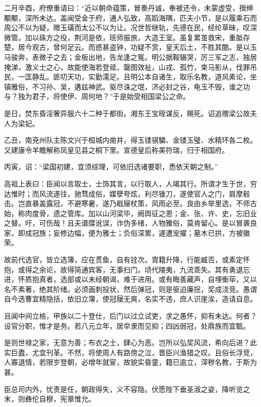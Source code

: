 \documentclass[12pt,UTF8]{ctexbook}
\begin{document}
二月辛酉，府僚重请曰：“近以朝命蕴策，冒奏丹诚，奉被还令，未蒙虚受，搢绅颙颙，深所未达。盖闻受金于府，通人弘致，高蹈海隅，匹夫小节，是以履乘石而周公不以为疑，赠玉璜而太公不以为让。况世哲继轨，先德在民，经纶草昧，叹深微管。加以硃方之役，荆河是依，班师振旅，大造王室。虽复累茧救宋，重胝存楚，居今观古，曾何足云。而惑甚盗钟，功疑不赏，皇天后土，不胜其酷。是以玉马骏奔，表微子之去；金板出地，告龙逢之冤。明公据鞍辍哭，厉三军之志，独居掩涕，激义士之心，故能使海若登祗，罄图效祉，山戎、孤竹，束马影从，伐罪吊民，一匡静乱。匪叨天功，实勤濡足。且明公本自诸生，取乐名教，道风素论，坐镇雅俗，不习孙、吴，遘兹神武。驱尽诛之氓，济必封之谷，龟玉不毁，谁之功与？独为君子，将使伊、周何地？”于是始受相国梁公之命。

是日，焚东昏淫奢异服六十二种于都街。湘东王宝晊谋反，赐死。诏追赠梁公故夫人为梁妃。

乙丑，南兗州队主陈文兴于桓城内凿井，得玉镂骐驎、金镂玉璧、水精环各二枚。又建康令羊瞻解称凤皇见县之桐下里。宣德皇后称美符瑞，归于相国府。

丙寅，诏：“梁国初建，宜须综理，可依旧选诸要职，悉依天朝之制。”

高祖上表曰：臣闻以言取士，士饰其言，以行取人，人竭其行。所谓才生于世，穷达惟时；而风流遂往，驰骛成俗，媒孽夸炫，利尽锥刀，遂使官人之门，肩摩毂击。岂直暴盖露冠，不避寒暑，遂乃戢屦杖策，风雨必至。良由乡举里选，不师古始，称肉度骨，遗之管库。加以山河梁毕，阙舆征之恩；金、张、许、史，忘旧业之替。吁，可伤哉！且夫谱牒讹误，诈伪多绪，人物雅俗，莫肯留心。是以冒袭良家，即成冠族；妄修边幅，便为雅士；负俗深累，遽遭宠擢；墓木已拱，方被徽荣。

故前代选官，皆立选簿，应在贯鱼，自有铨次。胄籍升降，行能臧否，或素定怀抱，或得之余论，故得简通宾客，无事扫门。顷代陵夷，九流乖失。其有勇退忘进，怀质抱真者，选部或以未经朝谒，难于进用。或有晦善藏声，自埋衡荜，又以名不素著，绝其阶绪。必须画刺投状，然后弹冠，则是驱迫廉捴，奖成浇竞。愚谓自今选曹宜精隐括，依旧立簿，使冠屦无爽，名实不违，庶人识崖涘，造请自息。

且闻中间立格，甲族以二十登仕，后门以过立试吏，求之愚怀，抑有未达。何者？设官分职，惟才是务。若八元立年，居皁隶而见抑；四凶弱冠，处鼎族而宜甄。

是则世禄之家，无意为善；布衣之士，肆心为恶。岂所以弘奖风流，希向后进？此实巨蠹，尤宜刊革。不然，将使周人有路傍之泣，晋臣兴渔猎之叹。且俗长浮竞，人寡退情，若限岁登朝，必增年就宦，故貌实昏童，籍已逾立，滓秽名教，于斯为甚。

臣总司内外，忧责是任，朝政得失，义不容隐。伏愿陛下垂圣淑之姿，降听览之末，则彝伦自穆，宪章惟允。
\end{document}
